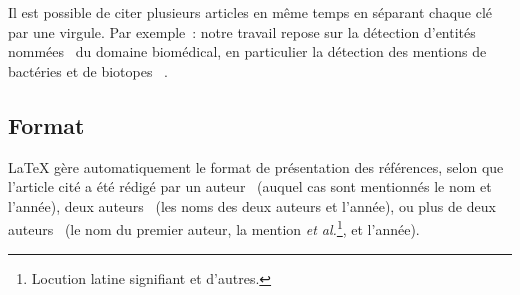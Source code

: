 \documentclass{report}
\begin{document}
Il est possible de citer plusieurs articles en même temps en séparant
chaque clé par une virgule. Par exemple~: notre travail repose sur la
détection d'entités nommées~%
du
domaine biomédical, en particulier la détection des mentions de
bactéries et de biotopes~%
.


\subsection{Format}
\LaTeX{} gère automatiquement le format de présentation des
références, selon que l'article cité a été rédigé par un
auteur~%
(auquel cas sont mentionnés le nom et
l'année), deux auteurs~%
(les noms des deux
auteurs et l'année), ou plus de deux auteurs~%
(le
nom du premier auteur, la mention \emph{et al.}\footnote{Locution
  latine signifiant \og{}et d'autres\fg{}.}, et l'année).
\end{document}
